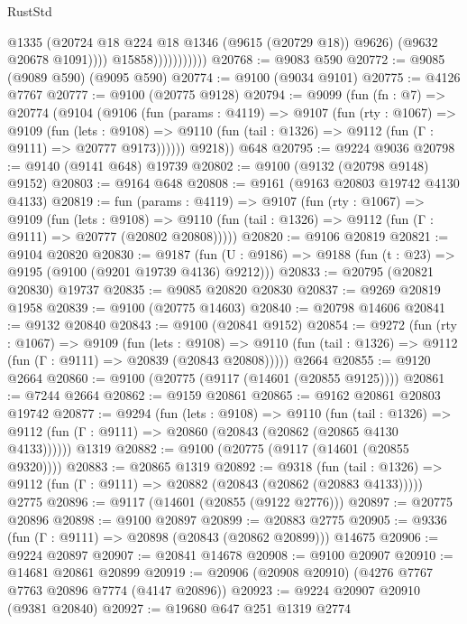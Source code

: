 \begin{lexlean}{RustStd}
\begin{coremodule}
                                @1335
                                (@20724 @18 @224 @18 @1346 (@9615 (@20729 @18)) @9626)
                                (@9632 @20678 @1091))))
                          @15858)))))))))))
@20768 := @9083 @590
@20772 := @9085 (@9089 @590) (@9095 @590)
@20774 := @9100 (@9034 @9101)
@20775 := @4126 @7767
@20777 := @9100 (@20775 @9128)
@20794 := @9099
    (fun (fn : @7) =>
    @20774
      (@9104
        (@9106
          (fun (params : @4119) =>
          @9107
            (fun (rty : @1067) =>
            @9109
              (fun (lets : @9108) =>
              @9110 (fun (tail : @1326) => @9112 (fun (Γ : @9111) => @20777 @9173))))))
        @9218))
    @648
@20795 := @9224 @9036
@20798 := @9140 (@9141 @648) @19739
@20802 := @9100 (@9132 (@20798 @9148) @9152)
@20803 := @9164 @648
@20808 := @9161 (@9163 @20803 @19742 @4130 @4133)
@20819 := fun (params : @4119) =>
  @9107
    (fun (rty : @1067) =>
    @9109
      (fun (lets : @9108) =>
      @9110 (fun (tail : @1326) => @9112 (fun (Γ : @9111) => @20777 (@20802 @20808)))))
@20820 := @9106 @20819
@20821 := @9104 @20820
@20830 := @9187
    (fun (U : @9186) => @9188 (fun (t : @23) => @9195 (@9100 (@9201 @19739 @4136) @9212)))
@20833 := @20795 (@20821 @20830) @19737
@20835 := @9085 @20820 @20830
@20837 := @9269 @20819 @1958
@20839 := @9100 (@20775 @14603)
@20840 := @20798 @14606
@20841 := @9132 @20840
@20843 := @9100 (@20841 @9152)
@20854 := @9272
    (fun (rty : @1067) =>
    @9109
      (fun (lets : @9108) =>
      @9110 (fun (tail : @1326) => @9112 (fun (Γ : @9111) => @20839 (@20843 @20808)))))
    @2664
@20855 := @9120 @2664
@20860 := @9100 (@20775 (@9117 (@14601 (@20855 @9125))))
@20861 := @7244 @2664
@20862 := @9159 @20861
@20865 := @9162 @20861 @20803 @19742
@20877 := @9294
    (fun (lets : @9108) =>
    @9110
      (fun (tail : @1326) =>
      @9112 (fun (Γ : @9111) => @20860 (@20843 (@20862 (@20865 @4130 @4133))))))
    @1319
@20882 := @9100 (@20775 (@9117 (@14601 (@20855 @9320))))
@20883 := @20865 @1319
@20892 := @9318
    (fun (tail : @1326) => @9112 (fun (Γ : @9111) => @20882 (@20843 (@20862 (@20883 @4133)))))
    @2775
@20896 := @9117 (@14601 (@20855 (@9122 @2776)))
@20897 := @20775 @20896
@20898 := @9100 @20897
@20899 := @20883 @2775
@20905 := @9336 (fun (Γ : @9111) => @20898 (@20843 (@20862 @20899))) @14675
@20906 := @9224 @20897
@20907 := @20841 @14678
@20908 := @9100 @20907
@20910 := @14681 @20861 @20899
@20919 := @20906 (@20908 @20910) (@4276 @7767 @7763 @20896 @7774 (@4147 @20896))
@20923 := @9224 @20907 @20910 (@9381 @20840)
@20927 := @19680 @647 @251 @1319 @2774

\end{coremodule}
\end{lexlean}
